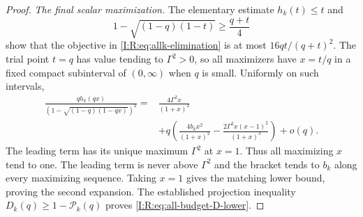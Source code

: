 \begin{proof}
\emph{The final scalar maximization.}
The elementary estimate $h_k(t)\le t$ and
\[
 1-\sqrt{(1-q)(1-t)}\ge\frac{q+t}{4}
\]
show that the objective in \eqref{I:R:eq:allk-elimination} is at most
$16qt/(q+t)^2$.  The trial point $t=q$ has value tending to
$\Gamma^2>0$, so all maximizers have $x=t/q$ in a fixed compact
subinterval of $(0,\infty)$ when $q$ is small.  Uniformly on such
intervals,
\begin{align*}
 \frac{q h_k(qx)}{(1-\sqrt{(1-q)(1-qx)})^2}
 ={}&\frac{4\Gamma^2x}{(1+x)^2}\\
 &+q\left(\frac{4b_kx^2}{(1+x)^2}
        -\frac{2\Gamma^2x(x-1)^2}{(1+x)^3}\right)+o(q).
\end{align*}
The leading term has its unique maximum $\Gamma^2$ at $x=1$.
Thus all maximizing $x$ tend to one.  The leading term is never above
$\Gamma^2$ and the bracket tends to $b_k$ along every maximizing
sequence.  Taking $x=1$ gives the matching lower bound, proving the
second expansion.  The established projection inequality
$D_k(q)\ge1-\mathcal P_k(q)$ proves
\eqref{I:R:eq:all-budget-D-lower}.
\end{proof}
